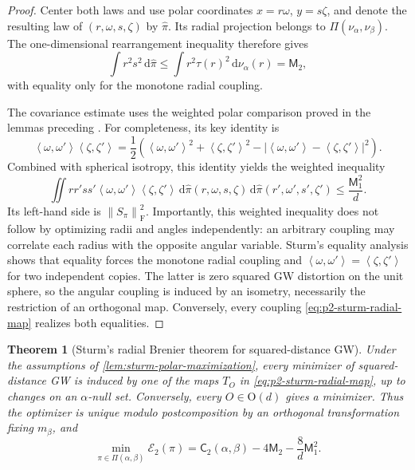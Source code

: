 \documentclass[11pt,a4paper]{article}
\newtheorem{theorem}{Theorem}[section]
\theoremstyle{definition}
\theoremstyle{remark}
\newcommand{\Ecal}{\mathcal E}
\newcommand{\Piopt}{\Pi}
\newcommand{\dd}{\,\mathrm d}
\newcommand{\norm}[1]{\left\lVert #1\right\rVert}
\newcommand{\abs}[1]{\left\lvert #1\right\rvert}
\newcommand{\ip}[2]{\left\langle #1,#2\right\rangle}
\begin{document}
\begin{proof}
Center both laws and use polar coordinates
\(x=r\omega\), \(y=s\zeta\), and denote the resulting law of
\((r,\omega,s,\zeta)\) by \(\widehat\pi\).  Its radial projection belongs to
\(\Piopt(\nu_\alpha,\nu_\beta)\).  The one-dimensional rearrangement
inequality therefore gives
\[
  \int r^2s^2\dd\widehat\pi
  \leq\int r^2\tau(r)^2\dd\nu_\alpha(r)=\mathsf M_2,
\]
with equality only for the monotone radial coupling.

The covariance estimate uses the weighted polar comparison proved in the
lemmas preceding \citet[Theorem~9.21]{Sturm2023Space}.  For completeness, its
key identity is
\begin{equation*}
  \ip{\omega}{\omega'}\ip{\zeta}{\zeta'}
  =\frac12\left(
    \ip{\omega}{\omega'}^2+\ip{\zeta}{\zeta'}^2
    -\abs{\ip{\omega}{\omega'}-\ip{\zeta}{\zeta'}}^2
  \right).
\end{equation*}
Combined with spherical isotropy, this identity yields the weighted
inequality
\begin{equation*}
  \iint rr'ss'\ip{\omega}{\omega'}\ip{\zeta}{\zeta'}
  \dd\widehat\pi(r,\omega,s,\zeta)
  \dd\widehat\pi(r',\omega',s',\zeta')
  \leq\frac{\mathsf M_1^2}{d}.
\end{equation*}
Its left-hand side is \(\norm{S_\pi}_{\mathrm F}^2\).  Importantly, this
weighted inequality does not follow by optimizing radii and angles
independently: an arbitrary coupling may correlate each radius with the
opposite angular variable.  Sturm's equality analysis shows that equality
forces the monotone radial coupling and
\(\ip{\omega}{\omega'}=\ip{\zeta}{\zeta'}\) for two independent copies.
The latter is zero squared GW distortion on the unit sphere, so the angular
coupling is induced by an isometry, necessarily the restriction of an
orthogonal map.  Conversely, every coupling
\eqref{eq:p2-sturm-radial-map} realizes both equalities.
\end{proof}

\begin{theorem}[Sturm's radial Brenier theorem for squared-distance GW]
\label{thm:sturm-radial-brenier}
Under the assumptions of \cref{lem:sturm-polar-maximization}, every minimizer
of squared-distance GW is induced by one of the maps \(T_O\) in
\eqref{eq:p2-sturm-radial-map}, up to changes on an \(\alpha\)-null set.
Conversely, every \(O\in\mathrm O(d)\) gives a minimizer.  Thus the optimizer
is unique modulo postcomposition by an orthogonal transformation fixing
\(m_\beta\), and
\begin{equation}
  \min_{\pi\in\Piopt(\alpha,\beta)}\Ecal_2(\pi)
  =\mathsf C_2(\alpha,\beta)
   -4\mathsf M_2-\frac{8}{d}\mathsf M_1^2.
  \label{eq:p2-sturm-radial-gw-value}
\end{equation}
\end{theorem}
\end{document}
